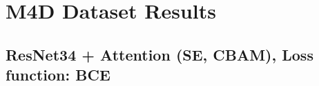 \documentclass{article}
\begin{document}
\section{M4D Dataset Results}
\subsection{ResNet34 + Attention (SE, CBAM), Loss function: BCE}

\end{document}
